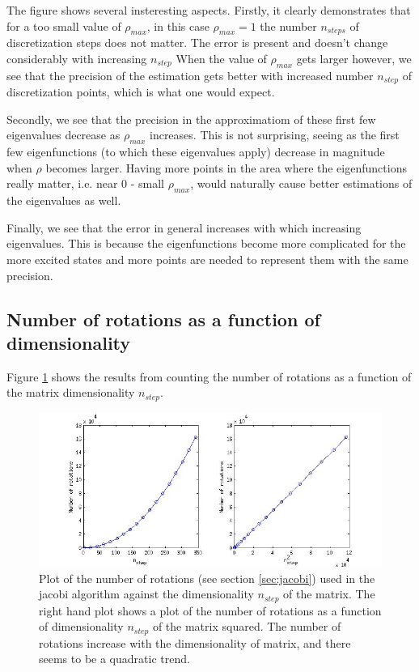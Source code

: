 \documentclass[a4paper,10pt,english]{article}
\numberwithin{figure}{subsection}
\numberwithin{table}{subsection}
\numberwithin{equation}{subsection}
\begin{document}
The figure shows several insteresting aspects. 
Firstly, it clearly demonstrates that for a too small value of $\rho_{max}$, 
in this case $\rho_{max}= 1$ the number $n_{steps}$ of discretization steps does not 
matter. 
The error is present and doesn't change considerably with increasing $n_{step}$
When the value of $\rho_{max}$ gets larger however, we see that 
the precision of the estimation gets better with increased number $n_{step}$ of 
discretization points,
which is what one would expect. 

Secondly, we see that the precision in the approximatiom of these first 
few eigenvalues decrease as $\rho_{max}$ increases. 
This is not surprising, seeing as the first few eigenfunctions
(to which these eigenvalues apply) 
decrease in magnitude when $\rho$ becomes larger. 
Having more points in the area where the eigenfunctions really matter, 
i.e. near $0$ - small $\rho_{max}$,
would naturally cause better estimations of the eigenvalues as well. 

Finally, we see that the error in general increases with which 
increasing eigenvalues. 
This is because the eigenfunctions become more complicated for 
the more excited states and more points are needed to represent them 
with the same precision. 



\subsection{Number of rotations as a function of dimensionality}

Figure \ref{fig:number_rotations_dim} shows the results from counting the number of rotations 
as a function of the matrix dimensionality $n_{step}$. 

\begin{figure}[h!]
  \centering 
  \includegraphics[width=\textwidth]{number_rotations_dim.jpg}
  \caption{Plot of the number of rotations (see section \ref{sec:jacobi}) used in the jacobi  
            algorithm against the
            dimensionality $n_{step}$ of the matrix. 
            The right hand plot shows a plot of the number of rotations as a function of 
            dimensionality $n_{step}$ of the matrix squared.
            The number of rotations increase with the dimensionality of matrix, 
            and there seems to be a quadratic trend.}
  \label{fig:number_rotations_dim}
\end{figure}
\end{document}
